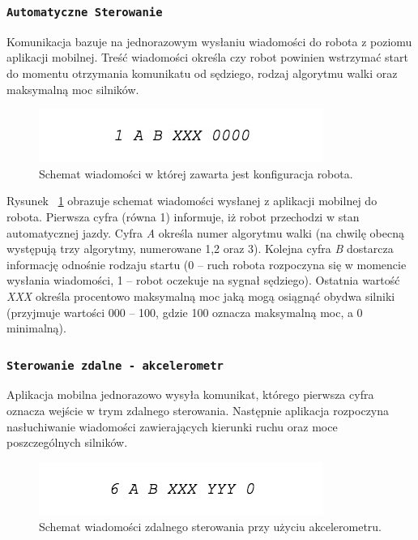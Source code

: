  \subsubsection{\lstinline$Automatyczne Sterowanie$}

Komunikacja bazuje na jednorazowym wysłaniu wiadomości do robota z poziomu aplikacji mobilnej. Treść wiadomości określa czy robot powinien wstrzymać start do momentu otrzymania komunikatu od sędziego, rodzaj algorytmu walki oraz maksymalną moc silników.

\begin{figure}[H]
	\centering
		\includegraphics[width=0.75\linewidth]{pic03/automatic.jpg}
	\caption{Schemat wiadomości w której zawarta jest konfiguracja robota.}
	\label{fig:automatic}	
\end{figure}

Rysunek ~\ref{fig:automatic} obrazuje schemat wiadomości wysłanej z aplikacji mobilnej do robota. Pierwsza cyfra (równa 1) informuje, iż robot przechodzi w stan automatycznej jazdy. Cyfra \textit{A} określa numer algorytmu walki (na chwilę obecną występują trzy algorytmy, numerowane 1,2 oraz 3). Kolejna cyfra \textit{B} dostarcza informację odnośnie rodzaju startu (0 – ruch robota rozpoczyna się w momencie wysłania wiadomości, 1 – robot oczekuje na sygnał sędziego). Ostatnia wartość \textit{XXX} określa procentowo maksymalną moc jaką mogą osiągnąć obydwa silniki (przyjmuje wartości 000 – 100, gdzie 100 oznacza maksymalną moc, a 0 minimalną).

 \subsubsection{\lstinline$Sterowanie zdalne - akcelerometr$}

Aplikacja mobilna jednorazowo wysyła komunikat, którego pierwsza cyfra oznacza wejście w trym zdalnego sterowania. Następnie aplikacja rozpoczyna nasłuchiwanie wiadomości zawierających kierunki ruchu oraz moce poszczególnych silników.

\begin{figure}[H]
	\centering
		\includegraphics[width=0.75\linewidth]{pic03/accelerometer.jpeg}
	\caption{Schemat wiadomości zdalnego sterowania przy użyciu akcelerometru.}
	\label{fig:accelerometer}	
\end{figure}

